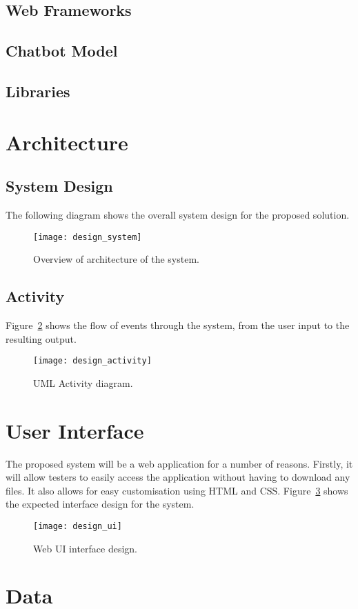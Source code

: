 \subsection{Web Frameworks}

\subsection{Chatbot Model}

\subsection{Libraries}

\newpage
\section{Architecture}
\subsection{System Design}
The following diagram shows the overall system design for the proposed solution.

\begin{figure}[h]
	\begin{center}
		\texttt{[image: design\_system]}
	\end{center}
	\caption{Overview of architecture of the system.}
	\label{fig:design_system}
\end{figure}

\newpage
\subsection{Activity}
Figure~\ref{fig:design_activity} shows the flow of events through the system, from the user input to the resulting output. 

\begin{figure}[h]
	\begin{center}
		\texttt{[image: design\_activity]}
	\end{center}
	\caption{UML Activity diagram.}
	\label{fig:design_activity}
\end{figure}

\newpage
\section{User Interface}
The proposed system will be a web application for a number of reasons. Firstly, it will allow testers to easily access the application without having to download any files. It also allows for easy customisation using HTML and CSS. Figure~\ref{fig:design_ui} shows the expected interface design for the system.

\begin{figure}[h]
	\begin{center}
		\texttt{[image: design\_ui]}
	\end{center}
	\caption{Web UI interface design.}
	\label{fig:design_ui}
\end{figure}

\section{Data}